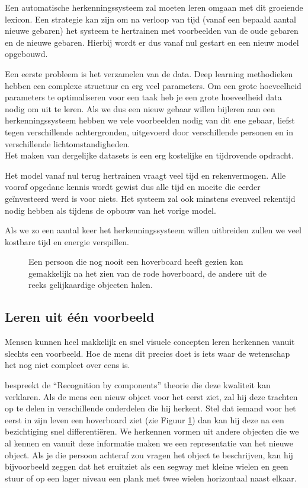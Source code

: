 \npar Een automatische herkenningssysteem zal moeten leren omgaan met dit groeiende lexicon. Een strategie kan zijn om na verloop van tijd (vanaf een bepaald aantal nieuwe gebaren) het systeem te hertrainen met voorbeelden van de oude gebaren en de nieuwe gebaren. Hierbij wordt er dus vanaf nul gestart en een nieuw model opgebouwd.

\npar Een eerste probleem is het verzamelen van de data. Deep learning methodieken hebben een complexe structuur en erg veel parameters. Om een grote hoeveelheid parameters te optimaliseren voor een taak heb je een grote hoeveelheid data nodig om uit te leren. Als we dus een nieuw gebaar willen bijleren aan een herkenningssysteem hebben we vele voorbeelden nodig van dit ene gebaar, liefst tegen verschillende achtergronden, uitgevoerd door verschillende personen en in verschillende lichtomstandigheden.
\\ Het maken van dergelijke datasets is een erg kostelijke en tijdrovende opdracht.

\npar Het model vanaf nul terug hertrainen vraagt veel tijd en rekenvermogen. Alle vooraf opgedane kennis wordt gewist dus alle tijd en moeite die eerder ge\"investeerd werd is voor niets. Het systeem zal ook minstens evenveel rekentijd nodig hebben als tijdens de opbouw van het vorige model.

\npar Als we zo een aantal keer het herkenningssysteem willen uitbreiden zullen we veel kostbare tijd en energie verspillen.

\begin{figure}[!t]
	\centering
	\def\svgscale{0.8}
	
	\caption{Een persoon die nog nooit een hoverboard heeft gezien kan gemakkelijk na het zien van de rode hoverboard, de andere uit de reeks gelijkaardige objecten halen. }\label{fig:one-shot-analogie}
\end{figure}

\subsection{Leren uit \'e\'en voorbeeld}
Mensen kunnen heel makkelijk en snel visuele concepten leren herkennen vanuit slechts een voorbeeld. Hoe de mens dit precies doet is iets waar de wetenschap het nog niet compleet over eens is.

\npar \cite{recognition-components} bespreekt de ``Recognition by components'' theorie  die deze kwaliteit kan verklaren. Als de mens een nieuw object voor het eerst ziet, zal hij deze trachten op te delen in verschillende onderdelen die hij herkent. Stel dat iemand voor het eerst in zijn leven een hoverboard ziet (zie Figuur \ref{fig:one-shot-analogie}) dan kan hij deze na een bezichtiging snel differenti\"eren. We herkennen vormen uit andere objecten die we al kennen en vanuit deze informatie maken we een representatie van het nieuwe object. Als je die persoon achteraf zou vragen het object te beschrijven, kan hij bijvoorbeeld zeggen dat het eruitziet als een segway met kleine wielen en geen stuur of op een lager niveau een plank met twee wielen horizontaal naast elkaar.

